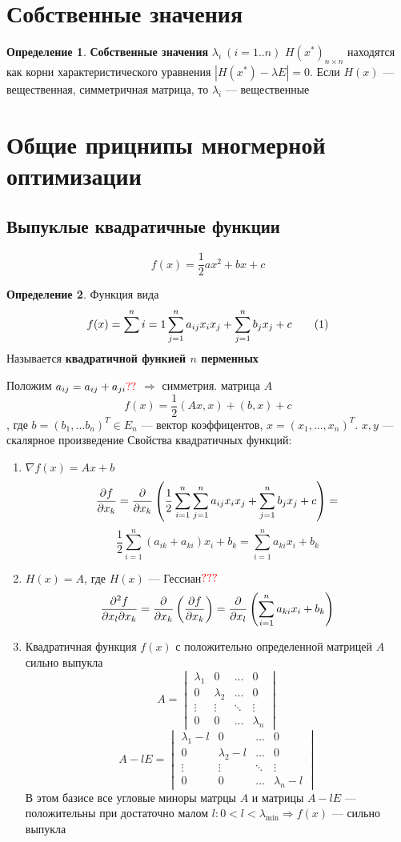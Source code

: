 \documentclass[oneside]{book}
\newcommand\addtag{\refstepcounter{equation}\tag{\theequation}}
\theoremstyle{plain}
\theoremstyle{remark}
\theoremstyle{definition}
\newtheorem*{definition}{Определение}
\begin{document}
\section{Собственные значения}
\label{sec:orgbf252d2}
\begin{definition}
\textbf{Собственные значения} \(\lambda_i\ (i = 1..n)\) \(H(x^*)_{n\times n}\) находятся как корни характеристического уравнения \(|H(x^*) - \lambda E| = 0\). Если \(H(x)\) --- вещественная, симметричная матрица, то \(\lambda_i\) --- вещественные
\end{definition}
\section{Общие прицнипы многмерной оптимизации}
\label{sec:orgcb0cf56}
\subsection{Выпуклые квадратичные функции}
\label{sec:org6980c89}
\[ f(x) = \frac{1}{2}ax^2 + bx + c \]
\begin{definition}
Функция вида
\[ f(x) = \sum^n{i = 1}\sum^n_{j = 1}a_{ij}x_ix_j + \sum^n_{j = 1}b_j x_j + c \addtag\label{7_1_quad} \]
Называется \textbf{квадратичной функией \(n\) перменных}
\end{definition}
Положим \(a_{ij} = a_{ij} + a_{ji} {\color{red}??}\) \(\Rightarrow\) симметрия. матрица \(A\)
\[ f(x) = \frac{1}{2}(Ax, x) + (b, x) + c \]
, где \(b = (b_1, \dots b_n)^T \in E_n\) --- вектор коэффицентов, \(x = (x_1, \dots, x_n)^T\). \(x, y\) --- скалярное произведение
Свойства квадратичных функций:
\begin{enumerate}
\item \(\nabla f(x) = Ax + b\)
\[ \frac{\partial f}{\partial x_k} = \frac{\partial }{\partial x_k}\left(\frac{1}{2}\sum^n_{i = 1}\sum^n_{j = 1}a_{ij}x_ix_j + \sum^n_{j = 1}b_j x_j + c\right) = \]
\[ \frac{1}{2}\sum^n_{i = 1}(a_{ik} + a_{ki})x_i + b_k = \sum^n_{i = 1} a_{ki}x_i + b_k \]
\item \(H(x) = A\), где \(H(x)\) --- Гессиан\(\color{red}???\) 
\[ \frac{\partial ^2 f}{\partial x_l \partial x_k} = \frac{\partial }{\partial x_k}\left(\frac{\partial f}{\partial x_k}\right) = \frac{\partial }{\partial x_l}\left(\sum^n_{i = 1} a_{ki} x_i + b_k\right) \]
\item Квадратичная функция \(f(x)\) с положительно определенной матрицей \(A\) сильно выпукла
\[ A = \begin{vmatrix} \lambda_1 & 0 & \dots & 0 \\ 0 & \lambda_2 & \dots & 0 \\ \vdots & \vdots & \ddots & \vdots \\ 0 & 0 & \dots & \lambda_n \end{vmatrix} \]
\[ A - lE = \begin{vmatrix} \lambda_1 - l & 0 & \dots & 0 \\ 0 & \lambda_2 - l & \dots & 0 \\ \vdots & \vdots & \ddots & \vdots \\ 0 & 0 & \dots & \lambda_n - l \end{vmatrix} \]
В этом базисе все угловые миноры матрцы \(A\) и матрицы \(A - lE\) --- положительны при достаточно малом \(l: 0 < l < \lambda_\min \Rightarrow f(x)\) --- сильно выпукла
\end{enumerate}
\end{document}
